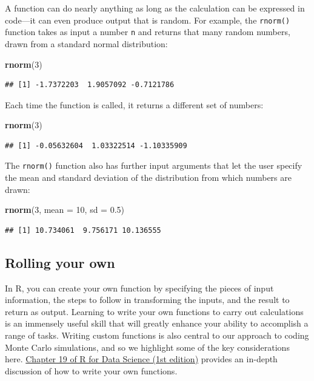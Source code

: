 \documentclass[
]{book}
\newenvironment{Shaded}{\begin{snugshade}}{\end{snugshade}}
\newcommand{\AttributeTok}[1]{\textcolor[rgb]{0.13,0.29,0.53}{#1}}
\newcommand{\DecValTok}[1]{\textcolor[rgb]{0.00,0.00,0.81}{#1}}
\newcommand{\FloatTok}[1]{\textcolor[rgb]{0.00,0.00,0.81}{#1}}
\newcommand{\FunctionTok}[1]{\textcolor[rgb]{0.13,0.29,0.53}{\textbf{#1}}}
\newcommand{\NormalTok}[1]{#1}
\begin{document}
A function can do nearly anything as long as the calculation can be expressed in code---it can even produce output that is random.
For example, the \texttt{rnorm()} function takes as input a number \texttt{n} and returns that many random numbers, drawn from a standard normal distribution:

\begin{Shaded}
\begin{Highlighting}[]
\FunctionTok{rnorm}\NormalTok{(}\DecValTok{3}\NormalTok{)}
\end{Highlighting}
\end{Shaded}

\begin{verbatim}
## [1] -1.7372203  1.9057092 -0.7121786
\end{verbatim}

Each time the function is called, it returns a different set of numbers:

\begin{Shaded}
\begin{Highlighting}[]
\FunctionTok{rnorm}\NormalTok{(}\DecValTok{3}\NormalTok{)}
\end{Highlighting}
\end{Shaded}

\begin{verbatim}
## [1] -0.05632604  1.03322514 -1.10335909
\end{verbatim}

The \texttt{rnorm()} function also has further input arguments that let the user specify the mean and standard deviation of the distribution from which numbers are drawn:

\begin{Shaded}
\begin{Highlighting}[]
\FunctionTok{rnorm}\NormalTok{(}\DecValTok{3}\NormalTok{, }\AttributeTok{mean =} \DecValTok{10}\NormalTok{, }\AttributeTok{sd =} \FloatTok{0.5}\NormalTok{)}
\end{Highlighting}
\end{Shaded}

\begin{verbatim}
## [1] 10.734061  9.756171 10.136555
\end{verbatim}

\subsection{Rolling your own}\label{rolling-your-own}

In R, you can create your own function by specifying the pieces of input information, the steps to follow in transforming the inputs, and the result to return as output.
Learning to write your own functions to carry out calculations is an immensely useful skill that will greatly enhance your ability to accomplish a range of tasks.
Writing custom functions is also central to our approach to coding Monte Carlo simulations, and so we highlight some of the key considerations here.
\href{https://r4ds.had.co.nz/functions.html}{Chapter 19 of R for Data Science (1st edition)} provides an in-depth discussion of how to write your own functions.
\end{document}
